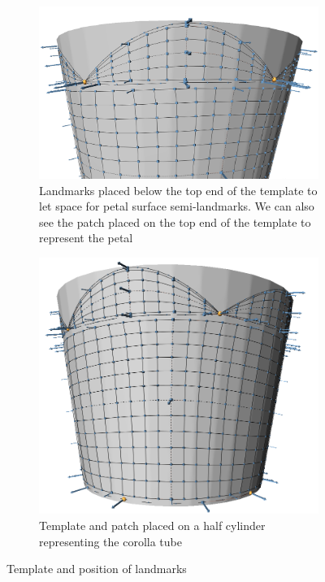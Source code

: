 \documentclass[10pt,letter,english]{article}
\begin{document}
 \begin{figure}[h]
\centering
\begin{subfigure}[t]{.45\linewidth} %
 \centering
  \includegraphics[width=1\linewidth]{Figures/checkpoint_landmarks_low.png}
  \caption{Landmarks placed below the top end of the template to let space for petal surface semi-landmarks. We can also see the patch placed on the top end of the template to represent the petal}
  \label{template_stratovan_a}
 \end{subfigure}\hspace{10pt}%
\vspace{10pt}
\begin{subfigure}[t]{.45\linewidth}
  \centering
  \includegraphics[width=1\linewidth]{Figures/chekcpoint_patch_tube.png}
  \caption{Template and patch placed on a half cylinder representing the corolla tube}
  \label{template_stratovan_b}
\end{subfigure}\hspace{10pt}%
 \caption{Template and position of landmarks}
  \label{template_stratovan}
\end{figure}
\end{document}
